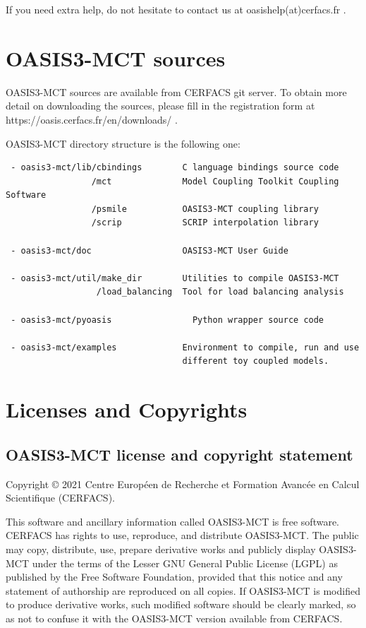 If you need extra help, do not hesitate to contact us at
oasishelp(at)cerfacs.fr .

\section{OASIS3-MCT sources}
\label{sec_Obtaining}
OASIS3-MCT sources are available from CERFACS git server. To obtain more detail on downloading
the sources, please fill in the registration form at https://oasis.cerfacs.fr/en/downloads/ .

OASIS3-MCT directory structure is the following one:

\begin{verbatim}
 - oasis3-mct/lib/cbindings        C language bindings source code
                 /mct              Model Coupling Toolkit Coupling Software
                 /psmile           OASIS3-MCT coupling library
                 /scrip            SCRIP interpolation library               

 - oasis3-mct/doc                  OASIS3-MCT User Guide

 - oasis3-mct/util/make_dir        Utilities to compile OASIS3-MCT
                  /load_balancing  Tool for load balancing analysis
                  
 - oasis3-mct/pyoasis	             Python wrapper source code

 - oasis3-mct/examples             Environment to compile, run and use
                                   different toy coupled models. 
\end{verbatim}
\newpage
\section{Licenses and Copyrights}
 
\subsection{OASIS3-MCT license and copyright statement}

Copyright © 2021 Centre Europ\'een de Recherche et Formation
Avanc\'ee en Calcul Scientifique (CERFACS).  

This software and ancillary information called OASIS3-MCT is free
software.  CERFACS has rights to use, reproduce, and distribute
OASIS3-MCT. The public may copy, distribute, use, prepare derivative works and
publicly display OASIS3-MCT under the terms of the Lesser GNU General
Public License (LGPL) as published by the Free Software Foundation,
provided that this notice and any statement of authorship are
reproduced on all copies. If OASIS3-MCT is modified to produce derivative
works, such modified software should be clearly marked, so as not to
confuse it with the OASIS3-MCT version available from CERFACS.

